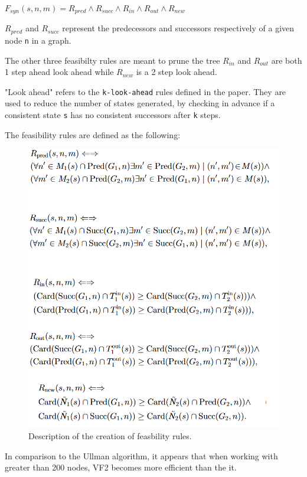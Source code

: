 \documentclass{article}
\begin{document}
  $F_{syn}(s,n,m) = R_{pred} \land R_{succ} \land R_{in} \land R_{out} \land R_{new}$

  $R_{pred}$ and $R_{succ}$ represent the predecessors and successors respectively of a given node \texttt{n}  in a graph.

  The other three feasibilty rules are meant to prune the tree
  $R_{in}$ and $R_{out}$ are both 1 step ahead look ahead while $R_{new}$ is a 2 step look ahead.

  "Look ahead" refers to the \texttt{k-look-ahead} rules defined in the paper. They are used to reduce the number of states generated, by checking in advance if a consistent state \texttt{s} has no consistent successors after \texttt{k} steps.

  The feasibility rules are defined as the following:

  \begin{figure}[H]
    \centering
    \includegraphics{images/vf2_algo.png}
    \caption{Description of the creation of feasbility rules.}
    \label{fuckyou}
  \end{figure}

  In comparison to the Ullman algorithm, it appears that when working with greater than 200 nodes, VF2 becomes more efficient than the it.
\end{document}
